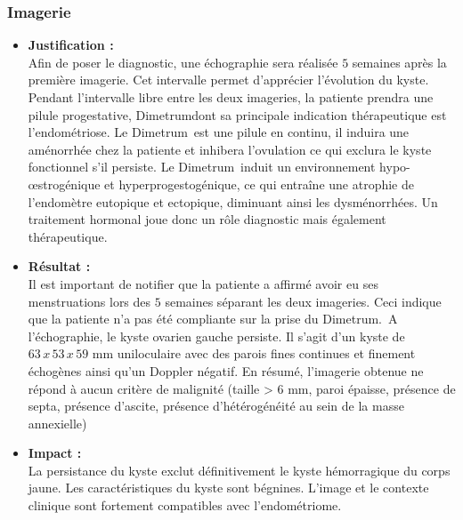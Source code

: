 \subsubsection{Imagerie}

\begin{itemize}[label=\textbullet]
    \item \textbf{Justification :}\\
    Afin de poser le diagnostic, une échographie sera réalisée $5$ semaines après la première imagerie. Cet intervalle permet d’apprécier l’évolution du kyste. Pendant l’intervalle libre entre les deux imageries, la patiente prendra une pilule progestative, Dimetrum\textregistered dont sa principale indication thérapeutique est l’endométriose. Le Dime\-trum\textregistered\ est une pilule en continu, il induira une aménorrhée chez la patiente et inhibera l’ovulation ce qui exclura le kyste fonctionnel s’il persiste. Le Dimetrum\textregistered\ induit un environnement hypo-œstrogénique et hyperprogestogénique, ce qui entraîne une atrophie de l'endomètre eutopique et ectopique, diminuant ainsi les dysménorrhées. Un traitement hormonal joue donc un rôle diagnostic mais également thérapeutique.
    
    \item \textbf{Résultat :}\\
    Il est important de notifier que la patiente a affirmé avoir eu ses menstruations lors des $5$ semaines séparant les deux imageries. Ceci indique que la patiente n’a pas été compliante sur la prise du Dimetrum\textregistered.\, A l’échographie, le kyste ovarien gauche persiste. Il s’agit d’un kyste de $63\,x\,53\,x\,59$ mm uniloculaire avec des parois fines continues et finement échogènes ainsi qu’un Doppler négatif. En résumé, l’imagerie obtenue ne répond à aucun critère de malignité (taille > $6$ mm, paroi épaisse, présence de septa, présence d’ascite, présence d’hétérogénéité au sein de la masse annexielle)
    
    \item \textbf{Impact :}\\
    La persistance du kyste exclut définitivement le kyste hémorragique du corps jaune. Les caractéristiques du kyste sont bégnines. L’image et le contexte clinique sont fortement compatibles avec l’endométriome.
\end{itemize}


